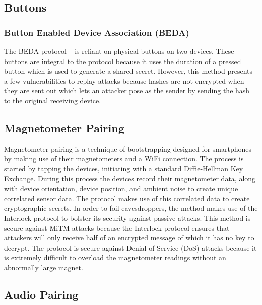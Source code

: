 \subsection{Buttons}
\subsubsection{Button Enabled Device Association (BEDA)}
The BEDA protocol ~\cite{soriente2007beda} is reliant on physical buttons on two devices.
These buttons are integral to the protocol because it uses the duration of a pressed button which is used to generate a shared secret.
However, this method presents a few vulnerabilities to replay attacks because hashes are not encrypted when they are sent out which lets an attacker pose as the sender by sending the hash to the original receiving device.



\subsection{Magnetometer Pairing}
Magnetometer pairing is a technique of bootstrapping designed for smartphones by making use of their magnetometers and a WiFi connection. The process is started by tapping the devices, initiating with a standard Diffie-Hellman Key Exchange. During this process the devices record their magnetometer data, along with device orientation, device position, and ambient noise to create unique correlated sensor data. The protocol makes use of this correlated data to create cryptographic secrets. In order to foil eavesdroppers, the method makes use of the Interlock protocol to bolster its security against passive attacks. This method is secure against MiTM attacks because the Interlock protocol ensures that attackers will only receive half of an encrypted message of which it has no key to decrypt. The protocol is secure against Denial of Service (DoS) attacks because it is extremely difficult to overload the magnetometer readings without an abnormally large magnet.

\subsection{Audio Pairing}
